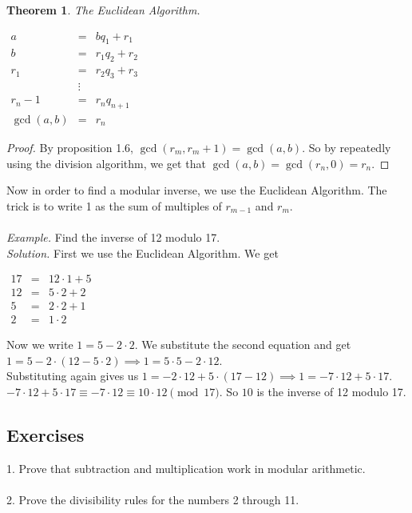 \documentclass[letterpaper]{article}
\theoremstyle{plain}
\newtheorem{thm}{Theorem}[section]
\theoremstyle{definition}
\theoremstyle{remark}
\begin{document}
\begin{mdframed}
    \begin{thm} 
        The Euclidean Algorithm. 
    \end{thm}
    \begin{center}
        $\begin{array}{rcl}
            a &= &bq_1 + r_1\\
            b &= &r_1q_2 + r_2\\
            r_1 &= &r_2q_3 + r_3\\
            &\vdots\\
            r_n-1 &= &r_nq_{n+1}\\
            \gcd(a,b) &= &r_n
        \end{array}$
    \end{center}
\end{mdframed}
\begin{proof}
    By proposition 1.6, $\gcd(r_m,r_m+1) = \gcd(a,b)$. So by repeatedly using the division algorithm, we get that $\gcd(a,b) = \gcd(r_n,0) = r_n$.
\end{proof}
Now in order to find a modular inverse, we use the Euclidean Algorithm.
The trick is to write 1 as the sum of multiples of $r_{m-1}$ and $r_m$.\\\\
\emph{Example.} Find the inverse of 12 modulo 17. \\
\emph{Solution.} First we use the Euclidean Algorithm. We get \\
\begin{center}
$\begin{array}{rcl}
    17 &= &12\cdot 1 + 5\\
    12 &= &5 \cdot 2 + 2\\
    5 &= &2 \cdot 2 + 1\\
    2 &= &1 \cdot 2
\end{array}$
\end{center}
Now we write $1 = 5-2\cdot 2$. We substitute the second equation and get
 $1 = 5 - 2\cdot(12-5\cdot 2) \implies 1 = 5\cdot 5 -2 \cdot 12$. \\
 Substituting again gives us
 $1 = -2\cdot 12 + 5\cdot(17-12) \implies 1 = -7 \cdot 12 + 5 \cdot 17$.\\ 
 $-7 \cdot 12 + 5\cdot 17 \equiv -7\cdot 12 \equiv 10 \cdot 12 \pmod{17}$. So $\boxed{10}$ is the inverse of 12 modulo 17.
\subsection*{Exercises}
1. Prove that subtraction and multiplication work in modular arithmetic.
\\
\\
2. Prove the divisibility rules for the numbers 2 through 11. 
\end{document}
